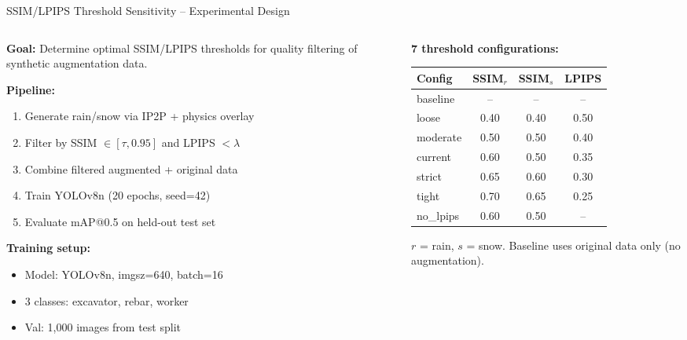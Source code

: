 \documentclass[aspectratio=169, 10pt]{beamer}
\begin{document}
\begin{frame}{SSIM/LPIPS Threshold Sensitivity -- Experimental Design}
\begin{columns}[T]
\begin{column}{0.48\textwidth}
\textbf{Goal:} Determine optimal SSIM/LPIPS thresholds for quality filtering of synthetic augmentation data.

\vspace{0.3em}
\textbf{Pipeline:}
\begin{enumerate}
    \item Generate rain/snow via IP2P + physics overlay
    \item Filter by SSIM $\in [\tau, 0.95]$ and LPIPS $< \lambda$
    \item Combine filtered augmented + original data
    \item Train YOLOv8n (20 epochs, seed=42)
    \item Evaluate mAP@0.5 on held-out test set
\end{enumerate}

\vspace{0.3em}
\textbf{Training setup:}
\begin{itemize}
    \item Model: YOLOv8n, imgsz=640, batch=16
    \item 3 classes: excavator, rebar, worker
    \item Val: 1,000 images from test split
\end{itemize}
\end{column}
\begin{column}{0.48\textwidth}
\textbf{7 threshold configurations:}

\vspace{0.3em}
{\small
\begin{tabular}{lccc}
\toprule
\textbf{Config} & \textbf{SSIM$_r$} & \textbf{SSIM$_s$} & \textbf{LPIPS} \\
\midrule
baseline  & --    & --    & --   \\
loose     & 0.40  & 0.40  & 0.50 \\
moderate  & 0.50  & 0.50  & 0.40 \\
current   & 0.60  & 0.50  & 0.35 \\
strict    & 0.65  & 0.60  & 0.30 \\
tight     & 0.70  & 0.65  & 0.25 \\
no\_lpips & 0.60  & 0.50  & --   \\
\bottomrule
\end{tabular}
}

\vspace{0.3em}
{\scriptsize $r$ = rain, $s$ = snow. Baseline uses original data only (no augmentation).}
\end{column}
\end{columns}
\end{frame}
\end{document}
